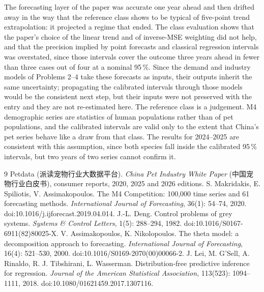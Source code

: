 The forecasting layer of the paper was accurate one year ahead and then drifted away in the way that the reference class shows to be typical of five-point trend extrapolation: it projected a regime that ended. The class evaluation shows that the paper's choice of the linear trend and of inverse-MSE weighting did not help, and that the precision implied by point forecasts and classical regression intervals was overstated, since those intervals cover the outcome three years ahead in fewer than three cases out of four at a nominal 95\,\%. Since the demand and industry models of Problems 2--4 take these forecasts as inputs, their outputs inherit the same uncertainty; propagating the calibrated intervals through those models would be the consistent next step, but their inputs were not preserved with the entry and they are not re-estimated here. The reference class is a judgement. M4 demographic series are statistics of human populations rather than of pet populations, and the calibrated intervals are valid only to the extent that China's pet series behave like a draw from that class. The results for 2024--2025 are consistent with this assumption, since both species fall inside the calibrated 95\,\% intervals, but two years of two series cannot confirm it.

\begin{thebibliography}{9}
 Petdata ({\cjkfont 派读宠物行业大数据平台}). \emph{China Pet Industry White Paper} ({\cjkfont 中国宠物行业白皮书}), consumer reports, 2020, 2025 and 2026 editions.
 S. Makridakis, E. Spiliotis, V. Assimakopoulos. The M4 Competition: 100,000 time series and 61 forecasting methods. \emph{International Journal of Forecasting}, 36(1): 54--74, 2020. doi:10.1016/j.ijforecast.2019.04.014.
 J.-L. Deng. Control problems of grey systems. \emph{Systems \& Control Letters}, 1(5): 288--294, 1982. doi:10.1016/S0167-6911(82)80025-X.
 V. Assimakopoulos, K. Nikolopoulos. The theta model: a decomposition approach to forecasting. \emph{International Journal of Forecasting}, 16(4): 521--530, 2000. doi:10.1016/S0169-2070(00)00066-2.
 J. Lei, M. G'Sell, A. Rinaldo, R. J. Tibshirani, L. Wasserman. Distribution-free predictive inference for regression. \emph{Journal of the American Statistical Association}, 113(523): 1094--1111, 2018. doi:10.1080/01621459.2017.1307116.
\end{thebibliography}

